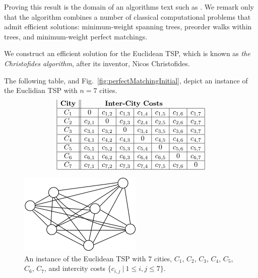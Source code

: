 Proving this result is the domain of an algorithms text such as
\cite{CLRS}.  We remark only that the algorithm combines a number of
classical computational problems that admit efficient solutions:
minimum-weight spanning trees, preorder walks within trees, and
minimum-weight perfect matchings.

\bigskip
We construct an efficient solution for the Euclidean TSP, which is
known as {\it the Christofides algorithm},  
after its inventor, Nicos Christofides.
\cite{Christofides76}

The following table, and Fig.~\ref{fig:perfectMatchingInitial}, depict
an instance of the Euclidian TSP with $n=7$ cities.
\[
\begin{array}{|c||c|c|c|c|c|c|c|}
\mbox{\bf City} & \multicolumn{6}{c}{\mbox{\bf Inter-City Costs}} \\
\hline
C_1 & 0 & c_{1,2} & c_{1,3} & c_{1,4} & c_{1,5} & c_{1,6} & c_{1,7} \\
\hline
C_2 & c_{2,1} & 0 & c_{2,3} & c_{2,4} & c_{2,5} & c_{2,6} & c_{2,7} \\
\hline
C_3 & c_{3,1} & c_{3,2} & 0 & c_{3,4} & c_{3,5} & c_{3,6} & c_{3,7} \\
\hline
C_4 & c_{4,1} & c_{4,2} & c_{4,3} & 0 & c_{4,5} & c_{4,6} & c_{4,7} \\
\hline
C_5 & c_{5,1} & c_{5,2} & c_{5,3} & c_{5,4} & 0 & c_{5,6} & c_{5,7} \\
\hline
C_6 & c_{6,1} & c_{6,2} & c_{6,3} & c_{6,4} & c_{6,5} & 0 & c_{6,7} \\
\hline
C_7 & c_{7,1} & c_{7,2} & c_{7,3} & c_{7,4} & c_{7,5} & c_{7,6} & 0 \\
\hline
\end{array}
\]


\begin{figure}[hbt]
\begin{center}
       \includegraphics[scale=0.8]{FiguresGraph/christofides1}
\caption{An instance of the Euclidean TSP with $7$ cities, $C_1$,
  $C_2$, $C_3$, $C_4$, $C_5$, $C_6$, $C_7$, and intercity costs
  $\{c_{i,j} \ | \ 1 \leq i,j \leq 7\}$.}
              \label{fig:christofidesInitial}
\end{center}
\end{figure}


